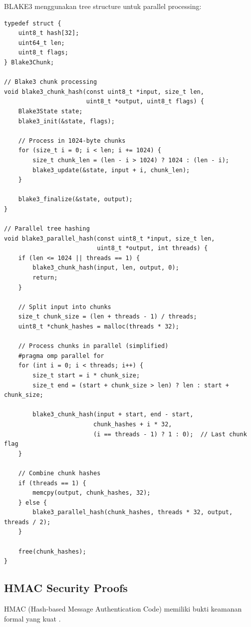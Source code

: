 BLAKE3 menggunakan tree structure untuk parallel processing:

\begin{lstlisting}[style=cstyle, caption={BLAKE3 Tree Structure}]
typedef struct {
    uint8_t hash[32];
    uint64_t len;
    uint8_t flags;
} Blake3Chunk;

// Blake3 chunk processing
void blake3_chunk_hash(const uint8_t *input, size_t len, 
                       uint8_t *output, uint8_t flags) {
    Blake3State state;
    blake3_init(&state, flags);
    
    // Process in 1024-byte chunks
    for (size_t i = 0; i < len; i += 1024) {
        size_t chunk_len = (len - i > 1024) ? 1024 : (len - i);
        blake3_update(&state, input + i, chunk_len);
    }
    
    blake3_finalize(&state, output);
}

// Parallel tree hashing
void blake3_parallel_hash(const uint8_t *input, size_t len, 
                          uint8_t *output, int threads) {
    if (len <= 1024 || threads == 1) {
        blake3_chunk_hash(input, len, output, 0);
        return;
    }
    
    // Split input into chunks
    size_t chunk_size = (len + threads - 1) / threads;
    uint8_t *chunk_hashes = malloc(threads * 32);
    
    // Process chunks in parallel (simplified)
    #pragma omp parallel for
    for (int i = 0; i < threads; i++) {
        size_t start = i * chunk_size;
        size_t end = (start + chunk_size > len) ? len : start + chunk_size;
        
        blake3_chunk_hash(input + start, end - start, 
                         chunk_hashes + i * 32, 
                         (i == threads - 1) ? 1 : 0);  // Last chunk flag
    }
    
    // Combine chunk hashes
    if (threads == 1) {
        memcpy(output, chunk_hashes, 32);
    } else {
        blake3_parallel_hash(chunk_hashes, threads * 32, output, threads / 2);
    }
    
    free(chunk_hashes);
}
\end{lstlisting}

\subsection{HMAC Security Proofs}

HMAC (Hash-based Message Authentication Code) memiliki bukti keamanan formal yang kuat \cite{bellare1996}.

